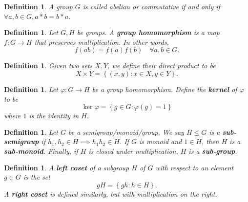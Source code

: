 \documentclass{article}
\theoremstyle{norm}
\newtheorem{df}[thm]{Definition}
\begin{document}
\begin{df}
A group $G$ is called abelian or commutative if and only if $\forall a,
b \in G, a * b = b * a$.
\end{df}

\begin{df}
Let $G, H$ be groups. A \textbf{group homomorphism} is a map $f : G
\rightarrow H$ that preserves multiplication. In other words,
\[ f(ab) = f(a) f(b) \quad \forall a, b \in G. \]
\end{df}

\begin{df}
Given two sets $X, Y$, we define their direct product to be
\[ X \times Y = \left\lbrace \left(x, y\right) : x \in X, y \in Y
\right\rbrace. \]
\end{df}

\begin{df}
Let $\varphi : G \rightarrow H$ be a group homomorphism. Define the
\textbf{kernel} of $\varphi$ to be
\[ \ker \varphi = \left\lbrace g \in G : \varphi(g) = 1 \right\rbrace \]
where $1$ is the identity in $H$.
\end{df}

\begin{df}
Let $G$ be a semigroup/monoid/group. We say $H \leq G$ is a
\textbf{sub-semigroup} if $h_1, h_2 \in H \implies h_1 h_2 \in H$. If
$G$ is monoid and $1 \in H$, then $H$ is a \textbf{sub-monoid}. Finally,
if $H$ is closed under multiplication, $H$ is a \textbf{sub-group}.
\end{df}

\begin{df}
A \textbf{left coset} of a subgroup $H$ of $G$ with respect to an element $g
\in G$ is the set
\[ gH = \left\lbrace gh : h \in H \right\rbrace. \]
A \textbf{right coset} is defined similarly, but with multiplication on
the right.
\end{df}
\end{document}
